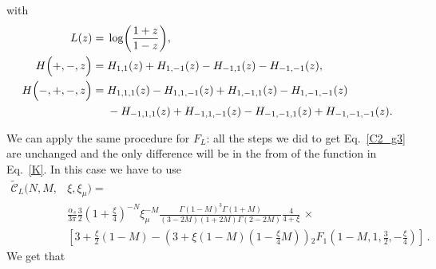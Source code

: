 \documentclass[a4paper]{article}
\newcommand{\C}[0]{\tilde{\mathcal{C}}}
\begin{document}
with
\begin{equation}
	\begin{split}
	L(z)={}&\log\biggl(\frac{1+z}{1-z}\biggr), \\
	H\Bigl(+,-,z\Bigr)={}&H_{1,1}(z)+H_{1,-1}(z)-H_{-1,1}(z)-H_{-1,-1}(z) ,\\
	H\Bigl(-,+,-,z\Bigr)={}&H_{1,1,1}(z)-H_{1,1,-1}(z)+H_{1,-1,1}(z) - H_{1,-1,-1}(z) \\
	&- H_{-1,1,1}(z) + H_{-1,1,-1}(z) - H_{-1,-1,1}(z) + H_{-1,-1,-1}(z).
	\end{split}
\end{equation}

We can apply the same procedure for $F_L$: all the steps we did to get Eq.~\eqref{C2_g3} are unchanged and the only difference will be in the from
of the function in Eq.~\eqref{K}. In this case we have to use
\begin{equation}
	\label{KL}
	\begin{split}
	\C_{L}(N, M,& \xi, \xi_\mu) = \\
	&\frac{\alpha_s}{3 \pi} \frac{3}{2} \left(1+\frac{\xi}{4}\right)^{-N}\xi_\mu^{-M} \frac{\Gamma(1-M)^3 \Gamma(1+M)}{(3-2M)(1+2M)\Gamma(2-2M)} \frac{4}{4 + \xi} \,\times \\
	& \left[3 + \frac{\xi}{2}(1 - M) - \left( 3 + \xi (1 - M)\left(1 - \frac{\xi}{4}M \right)\right){}_2F_1\left(1-M,1,\frac{3}{2}, -\frac{\xi}{4}\right)\right]\,.
	\end{split}
\end{equation}
We get that
\begingroup
\allowdisplaybreaks
\end{document}
